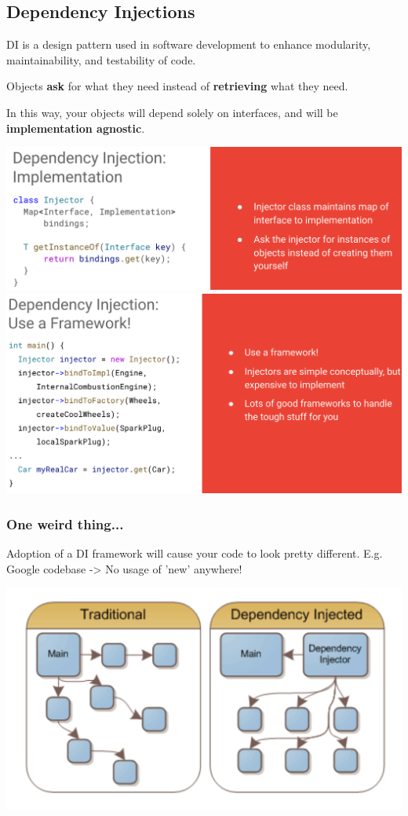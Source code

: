 \documentclass{article}
\begin{document}
\subsection{Dependency Injections}

DI is a design pattern used in software development to enhance modularity, maintainability, and testability of code.

\vspace*{1em}

Objects \textbf{ask} for what they need instead of \textbf{retrieving} what they need.

In this way, your objects will depend solely on interfaces, and will be \textbf{implementation agnostic}.

\includegraphics*[width=\linewidth]{DIEx1.png}
\includegraphics*[width=\linewidth]{DIFramwork.png}

\subsubsection*{One weird thing...}

Adoption of a DI framework will cause your code to look pretty different. E.g. Google codebase -> No usage of 'new' anywhere!

\begin{center}
    \includegraphics*[width=0.5\linewidth]{weirdDI.png}
\end{center}
\end{document}
